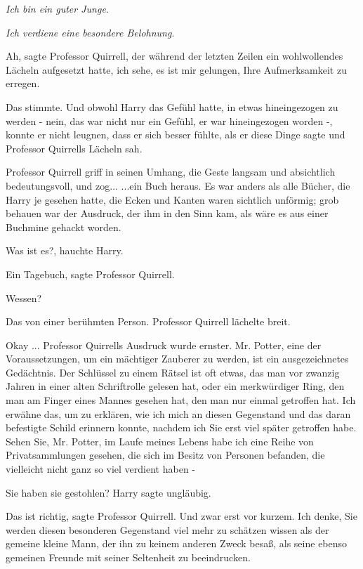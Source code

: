 \glqq{}\emph{Ich bin ein guter Junge}.\grqq{}

\glqq{}\emph{Ich verdiene eine besondere Belohnung}.\grqq{}

\glqq{}Ah\grqq{}, sagte Professor Quirrell, der während der letzten Zeilen ein
wohlwollendes Lächeln aufgesetzt hatte, \glqq{}ich sehe, es ist mir gelungen,
Ihre Aufmerksamkeit zu erregen.\grqq{}

Das stimmte. Und obwohl Harry das Gefühl hatte, in etwas hineingezogen zu werden
- nein, das war nicht nur ein Gefühl, er war hineingezogen worden -, konnte er
nicht leugnen, dass er sich besser fühlte, als er diese Dinge sagte und
Professor Quirrells Lächeln sah.

Professor Quirrell griff in seinen Umhang, die Geste langsam und absichtlich
bedeutungsvoll, und zog... ...ein Buch heraus. Es war anders als alle Bücher,
die Harry je gesehen hatte, die Ecken und Kanten waren sichtlich unförmig; grob
behauen war der Ausdruck, der ihm in den Sinn kam, als wäre es aus einer
Buchmine gehackt worden.

\glqq{}Was ist es?\grqq{}, hauchte Harry.

\glqq{}Ein Tagebuch\grqq{}, sagte Professor Quirrell.

\glqq{}Wessen?\grqq{}

\glqq{}Das von einer berühmten Person.\grqq{} Professor Quirrell lächelte breit.

\glqq{}Okay ...\grqq{} Professor Quirrells Ausdruck wurde ernster. \glqq{}Mr.
Potter, eine der Voraussetzungen, um ein mächtiger Zauberer zu werden, ist ein
ausgezeichnetes Gedächtnis. Der Schlüssel zu einem Rätsel ist oft etwas, das man
vor zwanzig Jahren in einer alten Schriftrolle gelesen hat, oder ein
merkwürdiger Ring, den man am Finger eines Mannes gesehen hat, den man nur
einmal getroffen hat. Ich erwähne das, um zu erklären, wie ich mich an diesen
Gegenstand und das daran befestigte Schild erinnern konnte, nachdem ich Sie erst
viel später getroffen habe. Sehen Sie, Mr. Potter, im Laufe meines Lebens habe
ich eine Reihe von Privatsammlungen gesehen, die sich im Besitz von Personen
befanden, die vielleicht nicht ganz so viel verdient haben -\grqq{}

\glqq{}Sie haben sie gestohlen?\grqq{} Harry sagte ungläubig.

\glqq{}Das ist richtig\grqq{}, sagte Professor Quirrell. \glqq{}Und zwar erst vor
kurzem. Ich denke, Sie werden diesen besonderen Gegenstand viel mehr zu schätzen
wissen als der gemeine kleine Mann, der ihn zu keinem anderen Zweck besaß, als
seine ebenso gemeinen Freunde mit seiner Seltenheit zu beeindrucken.\grqq{}

